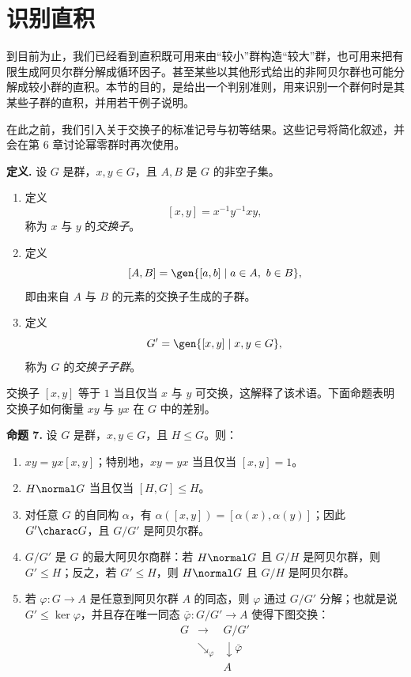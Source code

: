 \section{识别直积}

到目前为止，我们已经看到直积既可用来由“较小”群构造“较大”群，也可用来把有限生成阿贝尔群分解成循环因子。甚至某些以其他形式给出的非阿贝尔群也可能分解成较小群的直积。本节的目的，是给出一个判别准则，用来识别一个群何时是其某些子群的直积，并用若干例子说明。

在此之前，我们引入关于交换子的标准记号与初等结果。这些记号将简化叙述，并会在第 6 章讨论幂零群时再次使用。

\noindent\textbf{定义.} 设 $G$ 是群，$x,y\in G$，且 $A,B$ 是 $G$ 的非空子集。
\begin{enumerate}[label=(\arabic*)]
  \item 定义
  \[
    [x,y]=x^{-1}y^{-1}xy,
  \]
  称为 $x$ 与 $y$ 的\emph{交换子}。
  \item 定义
  \[
    [A,B]=\gen{[a,b]\mid a\in A,
\ b\in B},
  \]
  即由来自 $A$ 与 $B$ 的元素的交换子生成的子群。
  \item 定义
  \[
    G'=\gen{[x,y]\mid x,y\in G},
  \]
  称为 $G$ 的\emph{交换子子群}。
\end{enumerate}

交换子 $[x,y]$ 等于 $1$ 当且仅当 $x$ 与 $y$ 可交换，这解释了该术语。下面命题表明交换子如何衡量 $xy$ 与 $yx$ 在 $G$ 中的差别。

\medskip
\noindent\textbf{命题 7.} 设 $G$ 是群，$x,y\in G$，且 $H\leq G$。则：
\begin{enumerate}[label=(\arabic*)]
  \item $xy=yx[x,y]$；特别地，$xy=yx$ 当且仅当 $[x,y]=1$。
  \item $H\normal G$ 当且仅当 $[H,G]\leq H$。
  \item 对任意 $G$ 的自同构 $\alpha$，有 $\alpha([x,y])=[\alpha(x),\alpha(y)]$；因此 $G'\charac G$，且 $G/G'$ 是阿贝尔群。
  \item $G/G'$ 是 $G$ 的最大阿贝尔商群：若 $H\normal G$ 且 $G/H$ 是阿贝尔群，则 $G'\leq H$；反之，若 $G'\leq H$，则 $H\normal G$ 且 $G/H$ 是阿贝尔群。
  \item 若 $\varphi:G\to A$ 是任意到阿贝尔群 $A$ 的同态，则 $\varphi$ 通过 $G/G'$ 分解；也就是说 $G'\leq\ker\varphi$，并且存在唯一同态 $\bar\varphi:G/G'\to A$ 使得下图交换：
  \[
  \begin{array}{ccc}
  G & \longrightarrow & G/G'\\
  & \searrow_{\varphi} & \downarrow \bar\varphi\\
  & & A
  \end{array}
  \]
\end{enumerate}

